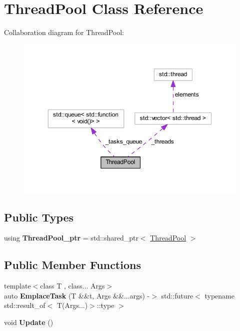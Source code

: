 \hypertarget{class_thread_pool}{}\section{Thread\+Pool Class Reference}
\label{class_thread_pool}


Collaboration diagram for Thread\+Pool\+:
\nopagebreak
\begin{figure}[H]
\begin{center}
\leavevmode
\includegraphics[width=350pt]{class_thread_pool__coll__graph}
\end{center}
\end{figure}
\subsection*{Public Types}
\begin{DoxyCompactItemize}
\item 
using {\bfseries Thread\+Pool\+\_\+ptr} = std\+::shared\+\_\+ptr$<$ \hyperlink{class_thread_pool}{Thread\+Pool} $>$\hypertarget{class_thread_pool_af2febe40d908829757ff4449645d917c}{}\label{class_thread_pool_af2febe40d908829757ff4449645d917c}

\end{DoxyCompactItemize}
\subsection*{Public Member Functions}
\begin{DoxyCompactItemize}
\item 
{\footnotesize template$<$class T , class... Args$>$ }\\auto {\bfseries Emplace\+Task} (T \&\&t, Args \&\&...args) -\/$>$ std\+::future$<$ typename std\+::result\+\_\+of$<$ T(Args...)$>$\+::type $>$        \hypertarget{class_thread_pool_a12bb5bd591b845f20323c465e3f28a9d}{}\label{class_thread_pool_a12bb5bd591b845f20323c465e3f28a9d}

\item 
void {\bfseries Update} ()\hypertarget{class_thread_pool_a744ca9298cb9fa9d248b05911b9f8224}{}\label{class_thread_pool_a744ca9298cb9fa9d248b05911b9f8224}

\end{DoxyCompactItemize}
